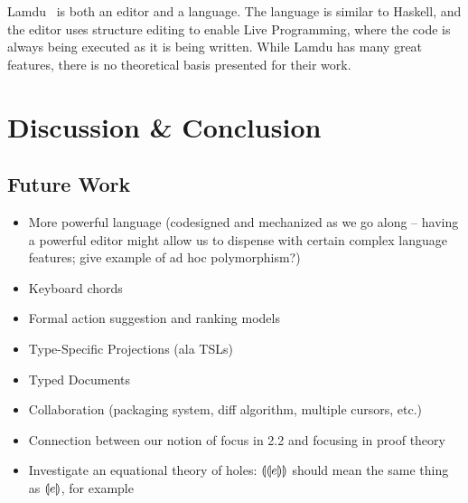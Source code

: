 \documentclass{llncs}
\begin{document}
Lamdu~\cite{lamdu} is both an editor and a language. The language is similar to Haskell, and the editor uses structure editing to enable Live Programming, where the code is always being executed as it is being written.
While Lamdu has many great features, there is no theoretical basis presented for their work.







%
%



\section{Discussion \& Conclusion}
\subsection{Future Work}
\begin{itemize}
\item More powerful language (codesigned and mechanized as we go along -- having a powerful editor might allow us to dispense with certain complex language features; give example of ad hoc polymorphism?)
\item Keyboard chords
\item Formal action suggestion and ranking models
\item Type-Specific Projections (ala TSLs)
\item Typed Documents
\item Collaboration (packaging system, diff algorithm, multiple cursors, etc.)
\item Connection between our notion of focus in 2.2 and focusing in proof theory
\item Investigate an equational theory of holes: $\llparenthesis\llparenthesis e\rrparenthesis\rrparenthesis$ should
  mean the same thing as $\llparenthesis e\rrparenthesis$, for example
\end{itemize}
\end{document}
